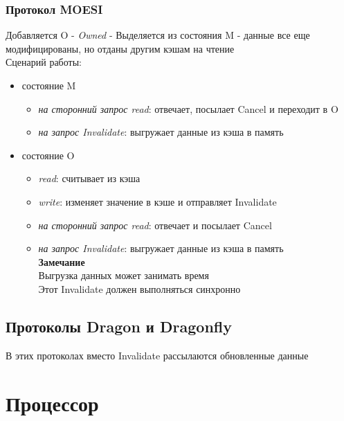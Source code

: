 \documentclass[12pt]{article}
\begin{document}
\subsubsection{Протокол MOESI}
Добавляется O - \textit{Owned} - Выделяется из состояния M - данные все еще модифицированы, но отданы другим кэшам на чтение\\
Сценарий работы:
\begin{itemize}
    \item состояние M
    \begin{itemize}
        \item \textit{на сторонний запрос read}: отвечает, посылает Cancel и переходит в O
        \item \textit{на запрос Invalidate}: выгружает данные из кэша в память
    \end{itemize}
    \item состояние O
    \begin{itemize}
        \item \textit{read}: считывает из кэша
        \item \textit{write}: изменяет значение в кэше и отправляет Invalidate 
        \item \textit{на сторонний запрос read}: отвечает и посылает Cancel
        \item \textit{на запрос Invalidate}: выгружает данные из кэша в память\\
        \textbf{Замечание}\\
        Выгрузка данных может занимать время\\
        Этот Invalidate должен выполняться синхронно
    \end{itemize}
\end{itemize}
\subsection{Протоколы Dragon и Dragonfly}
В этих протоколах вместо Invalidate рассылаются обновленные данные
\section{Процессор}
\end{document}
